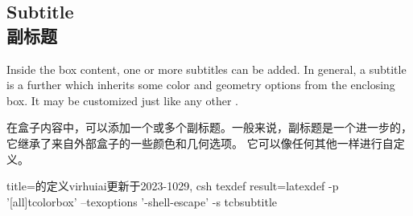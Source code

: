\setcounter{section}{4}
\setcounter{subsection}{1}
\setcounter{subsubsection}{0}

\subsection{Subtitle\\副标题}

Inside the box content, one or more subtitles can be added.
In general, a subtitle is a further  which inherits some color and geometry options from the enclosing box. 
It may be customized just like any other .


在盒子内容中，可以添加一个或多个副标题。一般来说，副标题是一个进一步的，它继承了来自外部盒子的一些颜色和几何选项。%
它可以像任何其他一样进行自定义。

\begin{tcblisting}{title={的定义\hfill virhuiai更新于2023-1029},
csh texdef result={latexdef -p '[all]tcolorbox' --texoptions '-shell-escape' -s tcbsubtitle}}
\newcommand{\tcbsubtitle}[2][]{%
  \begingroup%
  \colorlet{tcbtranscol@frame}{tcbcolframe}%
  \iftcb@titlefilled%
    \colorlet{tcbtranscol@back}{tcbcolbacktitle}%
  \else%
    \colorlet{tcbtranscol@back}{tcbcolframe}%
  \fi%
  \colorlet{tcbtranscol@upper}{tcbcoltitle}%
  \let\tcb@trans@fontupper\kvtcb@fonttitle%
  \let\tcb@trans@boxsep\kvtcb@boxsep%
  \let\tcb@trans@left\kvtcb@leftupper%
  \let\tcb@trans@right\kvtcb@rightupper%
  \let\tcb@trans@top\kvtcb@toptitle%
  \let\tcb@trans@bottom\kvtcb@bottomtitle%
  \let\tcb@trans@rule\kvtcb@title@rule%
  \let\tcb@trans@style\kvtcb@subtitle@style%
  \begin{tcolorbox}[sharp corners,
    before skip={0.5\baselineskip},
    after skip={0.5\baselineskip},
    colframe=tcbtranscol@frame,colback=tcbtranscol@back,
    colupper=tcbtranscol@upper,fontupper=\tcb@trans@fontupper,
    boxsep=\tcb@trans@boxsep,
    left=\tcb@trans@left,right=\tcb@trans@right,
    top=\tcb@trans@top,bottom=\tcb@trans@bottom,
    boxrule=\tcb@trans@rule,
    leftrule=\z@,rightrule=\z@,oversize,
    code={\pgfkeysalsofrom\tcb@trans@style},#1]%
  #2%
  \end{tcolorbox}%
  \endgroup%
}
\end{tcblisting}


